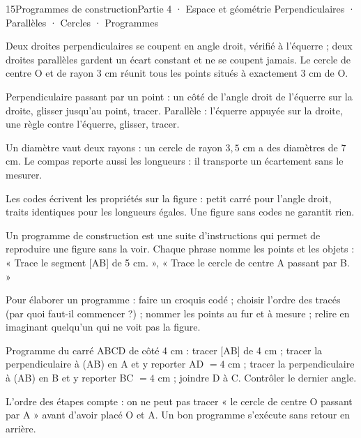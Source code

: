 \begin{ouverture}[geometrie]{15}{Programmes de construction}{Partie 4 · Espace et géométrie}
{Perpendiculaires · Parallèles · Cercles · Programmes}
\end{ouverture}
\pagestyle{otMain}\essentiel\fontsize{11}{15}\selectfont
{}\label{cours-15-1}
\begin{definition}Deux droites perpendiculaires se coupent en angle droit, vérifié à l’équerre ; deux droites parallèles gardent un écart constant et ne se coupent jamais. Le cercle de centre O et de rayon 3 cm réunit tous les points situés à exactement 3 cm de O.\end{definition}
\begin{savoirfaire}Perpendiculaire passant par un point : un côté de l’angle droit de l’équerre sur la droite, glisser jusqu’au point, tracer. Parallèle : l’équerre appuyée sur la droite, une règle contre l’équerre, glisser, tracer.\end{savoirfaire}
\begin{exemple}Un diamètre vaut deux rayons : un cercle de rayon $3{,}5$ cm a des diamètres de 7 cm. Le compas reporte aussi les longueurs : il transporte un écartement sans le mesurer.\end{exemple}
\begin{attention}Les codes écrivent les propriétés sur la figure : petit carré pour l’angle droit, traits identiques pour les longueurs égales. Une figure sans codes ne garantit rien.\end{attention}
\clearpage
{}\label{cours-15-2}
\begin{definition}Un programme de construction est une suite d’instructions qui permet de reproduire une figure sans la voir. Chaque phrase nomme les points et les objets : « Trace le segment [AB] de 5 cm. », « Trace le cercle de centre A passant par B. »\end{definition}
\begin{savoirfaire}Pour élaborer un programme : faire un croquis codé ; choisir l’ordre des tracés (par quoi faut-il commencer ?) ; nommer les points au fur et à mesure ; relire en imaginant quelqu’un qui ne voit pas la figure.\end{savoirfaire}
\begin{exemple}Programme du carré ABCD de côté 4 cm : tracer [AB] de 4 cm ; tracer la perpendiculaire à (AB) en A et y reporter AD $=4$ cm ; tracer la perpendiculaire à (AB) en B et y reporter BC $=4$ cm ; joindre D à C. Contrôler le dernier angle.\end{exemple}
\begin{attention}L’ordre des étapes compte : on ne peut pas tracer « le cercle de centre O passant par A » avant d’avoir placé O et A. Un bon programme s’exécute sans retour en arrière.\end{attention}

